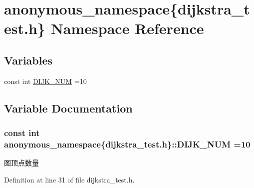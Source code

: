 \hypertarget{namespaceanonymous__namespace_02dijkstra__test_8h_03}{}\section{anonymous\+\_\+namespace\{dijkstra\+\_\+test.\+h\} Namespace Reference}
\label{namespaceanonymous__namespace_02dijkstra__test_8h_03}
\subsection*{Variables}
\begin{DoxyCompactItemize}
\item 
const int \hyperlink{namespaceanonymous__namespace_02dijkstra__test_8h_03_a2cccdbeba19d23851ebd1edad58701de}{D\+I\+J\+K\+\_\+\+N\+U\+M} =10
\end{DoxyCompactItemize}


\subsection{Variable Documentation}
\hypertarget{namespaceanonymous__namespace_02dijkstra__test_8h_03_a2cccdbeba19d23851ebd1edad58701de}{}
\subsubsection[{D\+I\+J\+K\+\_\+\+N\+U\+M}]{\setlength{\rightskip}{0pt plus 5cm}const int anonymous\+\_\+namespace\{dijkstra\+\_\+test.\+h\}\+::D\+I\+J\+K\+\_\+\+N\+U\+M =10}\label{namespaceanonymous__namespace_02dijkstra__test_8h_03_a2cccdbeba19d23851ebd1edad58701de}
图顶点数量 

Definition at line 31 of file dijkstra\+\_\+test.\+h.

